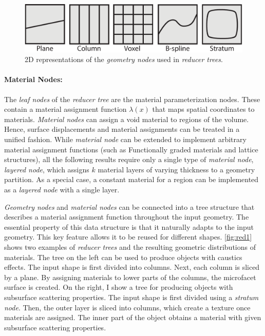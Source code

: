 \begin{figure}[h]
\centering
\includegraphics[width=0.7\linewidth]{figure/geometryNodes}
\caption{2D representations  of the \emph{geometry nodes} used in \emph{reducer trees}.}
\label{fig:geometryNodes}
\end{figure}

\paragraph{Material Nodes:} The \emph{leaf nodes} of the \emph{reducer tree} are the material parameterization nodes. These contain a material assignment function $\lambda\left(x\right)$ that maps spatial coordinates to materials. \emph{Material nodes} can assign a void material to regions of the volume. Hence, surface displacements and material assignments can be treated in a unified fashion.
While \emph{material node} can be extended to implement arbitrary material assignment functions
(such as Functionally graded materials and lattice structures),
all the following results require only a single type of \emph{material node}, \emph{layered node}, which assigns $k$ material layers of varying thickness to a geometry partition.
As a special case, a constant material for a region can be implemented as a \emph{layered node} with a single layer.

\emph{Geometry nodes} and \emph{material nodes} can be connected into a tree structure that describes a material assignment function throughout the input geometry. 
The essential property of this data structure is that it naturally adapts to the input geometry. This key feature allows it to be reused for different shapes.
\autoref{fig:red1} shows two examples of \emph{reducer trees} and the resulting geometric distributions of materials.
The tree on the left can be used to produce objects with caustics effects.
The input shape is first divided into columns. Next, each column is sliced by a plane.
By assigning materials to lower parts of the columns, the microfacet surface is created.
On the right, I show a tree for producing objects with subsurface scattering properties.
The input shape is first divided using a \emph{stratum node}. Then, the outer layer is sliced into columns, which create a texture once materials are assigned. The inner part of the object obtains a material with given subsurface scattering properties.

